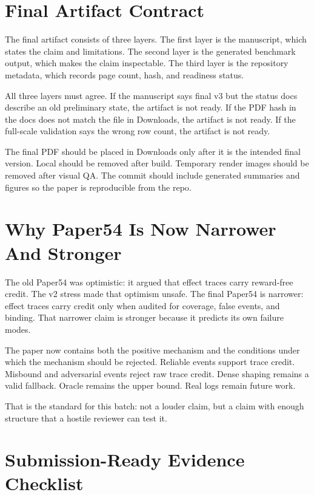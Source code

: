 \documentclass{article}
\begin{document}
\section{Final Artifact Contract}

The final artifact consists of three layers. The first layer is the manuscript, which states the claim and limitations. The second layer is the generated benchmark output, which makes the claim inspectable. The third layer is the repository metadata, which records page count, hash, and readiness status.

All three layers must agree. If the manuscript says final v3 but the status docs describe an old preliminary state, the artifact is not ready. If the PDF hash in the docs does not match the file in Downloads, the artifact is not ready. If the full-scale validation says the wrong row count, the artifact is not ready.

The final PDF should be placed in Downloads only after it is the intended final version. Local  should be removed after build. Temporary render images should be removed after visual QA. The commit should include generated summaries and figures so the paper is reproducible from the repo.

\section{Why Paper54 Is Now Narrower And Stronger}

The old Paper54 was optimistic: it argued that effect traces carry reward-free credit. The v2 stress made that optimism unsafe. The final Paper54 is narrower: effect traces carry credit only when audited for coverage, false events, and binding. That narrower claim is stronger because it predicts its own failure modes.

The paper now contains both the positive mechanism and the conditions under which the mechanism should be rejected. Reliable events support trace credit. Misbound and adversarial events reject raw trace credit. Dense shaping remains a valid fallback. Oracle remains the upper bound. Real logs remain future work.

That is the standard for this batch: not a louder claim, but a claim with enough structure that a hostile reviewer can test it.

\section{Submission-Ready Evidence Checklist}
\end{document}
